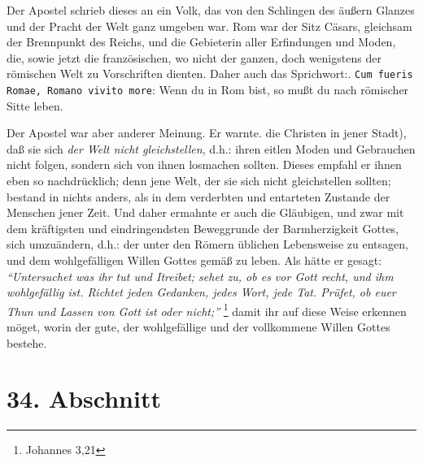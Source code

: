 \medskip

Der Apostel schrieb dieses an ein Volk, das von den Schlingen des äußern Glanzes
und der Pracht der Welt ganz umgeben war. Rom war der Sitz
Cäsars, gleichsam
der Brennpunkt des Reichs, und die Gebieterin aller Erfindungen und Moden, die,
sowie jetzt die französischen, wo nicht der ganzen, doch wenigstens der
römischen Welt zu Vorschriften dienten. Daher auch das Sprichwort:. \texttt{Cum
fueris Romae, Romano vivito more}: Wenn du in Rom bist, so mußt
du nach römischer Sitte leben.

\medskip

Der Apostel war aber anderer Meinung. Er warnte.
die Christen in jener
Stadt), daß sie sich \textit{der Welt nicht gleichstellen}, d.h.: ihren eitlen
Moden
und Gebrauchen nicht folgen, sondern sich von ihnen losmachen sollten.
Dieses empfahl er ihnen eben so nachdrücklich; denn jene Welt, der sie sich
nicht gleichstellen sollten; bestand in nichts anders, als in dem verderbten und
entarteten Zustande der Menschen jener Zeit. Und daher ermahnte er auch die
Gläubigen, und zwar mit dem kräftigsten und eindringendsten Beweggrunde der
Barmherzigkeit Gottes, sich umzuändern, d.h.: der unter den Römern üblichen
Lebensweise zu entsagen, und dem wohlgefälligen Willen Gottes gemäß zu leben.
Als hätte er gesagt:
\textit{"`Untersuchet was ihr tut und Itreibet; sehet zu, ob es vor
Gott recht, und ihm wohlgefällig ist. Richtet jeden Gedanken, jedes Wort, jede
Tat. Prüfet, ob euer Thun und Lassen von Gott ist oder nicht;"'}
\footnote{Johannes 3,21}
damit ihr auf diese Weise erkennen möget, worin der gute, der
wohlgefällige und der vollkommene Willen Gottes bestehe.

\section{34. Abschnitt} \label{kap9_ab34}

